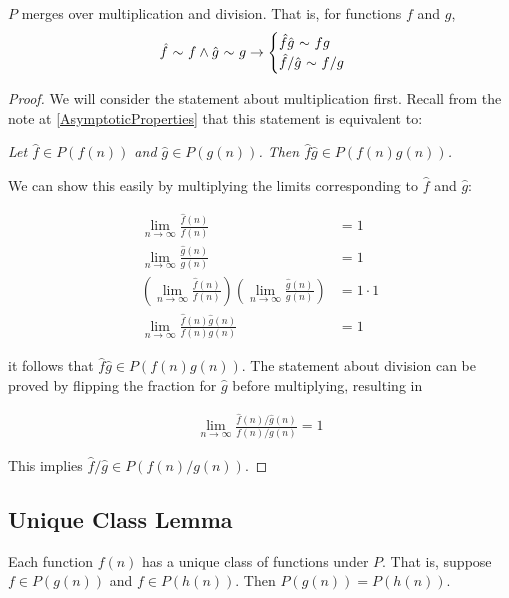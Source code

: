 \begin{theorem}
	$P$ merges over multiplication and division. That is, for functions $f$ and $g$,
	\begin{align*}
	\hat{f} \ \mathtt{\sim}\  f \land \hat{g} \ \mathtt{\sim}\  g \rightarrow \begin{cases}
	\hat{f}\hat{g} \ \mathtt{\sim}\  fg\\
	\hat{f} / \hat{g} \ \mathtt{\sim}\  f / g
	\end{cases}
	\end{align*}
\end{theorem}

\begin{proof}
	We will consider the statement about multiplication first. Recall from the note at \ref{AsymptoticProperties} that this statement is equivalent to:
	
	\textit{Let $\hat{f} \in P(f(n))$ and $\hat{g} \in P(g(n))$. Then $\hat{f}\hat{g} \in P(f(n)g(n))$.}
	
	We can show this easily by multiplying the limits corresponding to $\hat{f}$ and $\hat{g}$:
	
	\begin{align*}
	\lim_{n \to \infty} \frac{\hat{f}(n)}{f(n)} &= 1\\
	\lim_{n \to \infty} \frac{\hat{g}(n)}{g(n)} &= 1\\
	\left( \lim_{n \to \infty} \frac{\hat{f}(n)}{f(n)} \right) \left( \lim_{n \to \infty} \frac{\hat{g}(n)}{g(n)} \right) &= 1 \cdot 1\\
	\lim_{n \to \infty} \frac{\hat{f}(n)\hat{g}(n)}{f(n)g(n)} &= 1
	\end{align*}
	
	it follows that $\hat{f}\hat{g} \in P(f(n)g(n))$. The statement about division can be proved by flipping the fraction for $\hat{g}$ before multiplying, resulting in
	
	\begin{align*}
	\lim_{n \to \infty} \frac{\hat{f}(n) / \hat{g}(n)}{f(n) / g(n)} = 1
	\end{align*}
	
	This implies $\hat{f} / \hat{g} \in P(f(n) / g(n))$.
\end{proof}

\subsection{Unique Class Lemma}
\label{UniqueClassOfFunctions}

\begin{lemma}
	Each function $f(n)$ has a unique class of functions under $P$. That is, suppose $f \in P(g(n))$ and $f \in P(h(n))$. Then $P(g(n)) = P(h(n))$.
\end{lemma}

